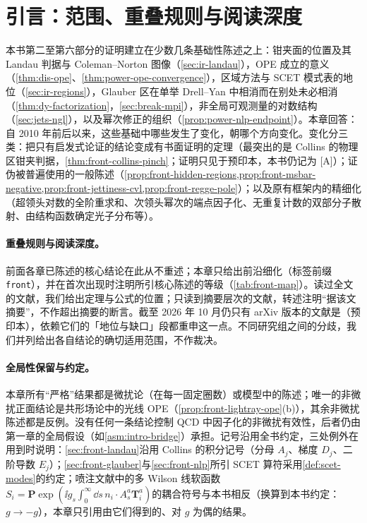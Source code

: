 \section{引言：范围、重叠规则与阅读深度}\label{sec:front-intro}

本书第二至第六部分的证明建立在少数几条基础性陈述之上：钳夹面的位置及其 Landau 判据与 Coleman--Norton 图像（\cref{sec:ir-landau}），OPE 成立的意义（\cref{thm:dis-ope}、\cref{thm:power-ope-convergence}），区域方法与 SCET 模式表的地位（\cref{sec:ir-regions}），Glauber 区在单举 Drell--Yan 中相消而在别处未必相消（\cref{thm:dy-factorization}，\cref{sec:break-mpi}），非全局可观测量的对数结构（\cref{sec:jets-ngl}），以及幂次修正的组织（\cref{prop:power-nlp-endpoint}）。本章回答：自 2010 年前后以来，这些基础中哪些发生了变化，朝哪个方向变化。变化分三类：把只有启发式论证的结论变成有书面证明的定理（最突出的是 Collins 的物理区钳夹判据，\cref{thm:front-collins-pinch}；证明只见于预印本，本书仍记为 [A]）；证伪被普遍使用的一般陈述（\cref{prop:front-hidden-regions,prop:front-msbar-negative,prop:front-jettiness-cvl,prop:front-regge-pole}）；以及原有框架内的精细化（超领头对数的全阶重求和、次领头幂次的端点因子化、无重复计数的双部分子散射、由结构函数确定光子分布等）。

\paragraph{重叠规则与阅读深度。}前面各章已陈述的核心结论在此从不重述；本章只给出前沿细化（标签前缀 \texttt{front}），并在首次出现时注明所引核心陈述的等级（\cref{tab:front-map}）。读过全文的文献，我们给出定理与公式的位置；只读到摘要层次的文献，转述注明“据该文摘要”，不作超出摘要的断言。截至 2026 年 10 月仍只有 arXiv 版本的文献是\cite{Collins:2020euz,Frob:2016mzv,Guida:2011np,Beneke:2026miy,Gamberg:2022lju,Bodwin:2025zzi,Anastasiou:2025cvy,Anastasiou:2026kpm,Anastasiou:2026jta,Becher:2026zon,Becher:2026iim}（预印本），依赖它们的「地位与缺口」段都重申这一点。不同研究组之间的分歧，我们并列给出各自结论的确切适用范围，不作裁决。

\paragraph{全局性保留与约定。}本章所有“严格”结果都是微扰论（在每一固定圈数）或模型中的陈述；唯一的非微扰正面结论是共形场论中的光线 OPE（\cref{prop:front-lightray-ope}(b)），其余非微扰陈述都是反例。没有任何一条结论控制 QCD 中因子化的非微扰有效性，后者仍由第一章的全局假设（如\cref{asm:intro-bridge}）承担。记号沿用全书约定，三处例外在用到时说明：\cref{sec:front-landau}沿用 Collins 的积分记号（分母 $A_j$、梯度 $D_j$、二阶导数 $E_j$）；\cref{sec:front-glauber}与\cref{sec:front-nlp}所引 SCET 算符采用\cref{def:scet-modes}的约定；喷注文献中的多 Wilson 线软函数 $S_i=\mathbf P\exp(\ii g_s\int_0^\infty\dd s\,n_i\cdot A^a_s\mathbf T^a_i)$\cite{Becher:2016mmh}的耦合符号与本书相反（换算到本书约定：$g\to-g$），本章只引用由它们得到的、对 $g$ 为偶的结果。

